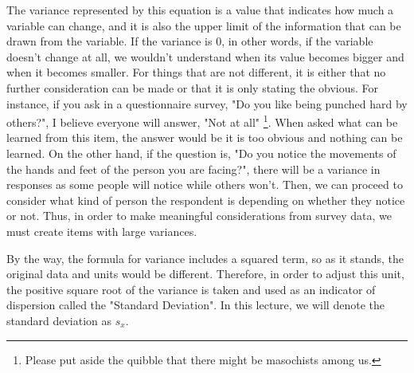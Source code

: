 \documentclass{ltjsbook}
\begin{document}
The variance represented by this equation is a value that indicates how much a variable can change, and it is also the upper limit of the information that can be drawn from the variable. If the variance is $0$, in other words, if the variable doesn't change at all, we wouldn't understand when its value becomes bigger and when it becomes smaller. For things that are not different, it is either that no further consideration can be made or that it is only stating the obvious. For instance, if you ask in a questionnaire survey, "Do you like being punched hard by others?", I believe everyone will answer, "Not at all" \footnote {Please put aside the quibble that there might be masochists among us.}. When asked what can be learned from this item, the answer would be it is too obvious and nothing can be learned. On the other hand, if the question is, "Do you notice the movements of the hands and feet of the person you are facing?", there will be a variance in responses as some people will notice while others won't. Then, we can proceed to consider what kind of person the respondent is depending on whether they notice or not. Thus, in order to make meaningful considerations from survey data, we must create items with large variances.

By the way, the formula for variance includes a squared term, so as it stands, the original data and units would be different. Therefore, in order to adjust this unit, the positive square root of the variance is taken and used as an indicator of dispersion called the "Standard Deviation". In this lecture, we will denote the standard deviation as $s_x$.
\end{document}
